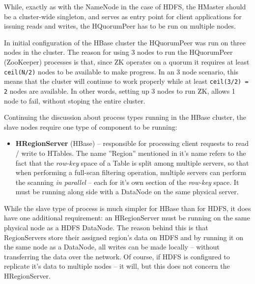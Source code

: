 While, exactly as with the NameNode in the case of HDFS, the HMaster should be a cluster-wide singleton, and serves as entry point for client applications for issuing reads and writes, the HQuorumPeer has to be run on multiple nodes. 

In initial configuration of the HBase cluster the HQuorumPeer was run on three nodes in the cluster. The reason for using 3 nodes to run the HQuorumPeer (ZooKeeper) processes is that, since ZK operates on a quorum it requires at least \verb|ceil(N/2)| nodes to be available to make progress. In an 3 node scenario, this means that the cluster will continue to work properly while at least \verb|ceil(3/2) = 2| nodes are available. In other words, setting up 3 nodes to run ZK, allows 1 node to fail, without stoping the entire cluster.

Continuing the discussion about process types running in the HBase cluster, the slave nodes require one type of component to be running:

\begin{itemize}
\item \textbf{HRegionServer} (HBase) -- responsible for processing client requests to read / write to HTables.
                                        The name ''Region'' mentioned in it's name refers to the fact that the 
                                        \textit{row-key} space of a Table is split among multiple servers, so that when
                                        performing a full-scan filtering operation, multiple servers can perform the
                                        scanning \textit{in parallel} -- each for it's own section of the
                                        \textit{row-key} space. It must be running along side with a DataNode on the
                                        same physical server.
                                        
\end{itemize}

While the slave type of process is much simpler for HBase than for HDFS, it does have one additional requirement: an HRegionServer must be running on the same physical node as a HDFS DataNode. The reason behind this is that RegionServers store their assigned region's data on HDFS and by running it on the same node as a DataNode, all writes can be made locally -- without transferring the data over the network. Of course, if HDFS is configured to replicate it's data to multiple nodes -- it will, but this does not concern the HRegionServer.


